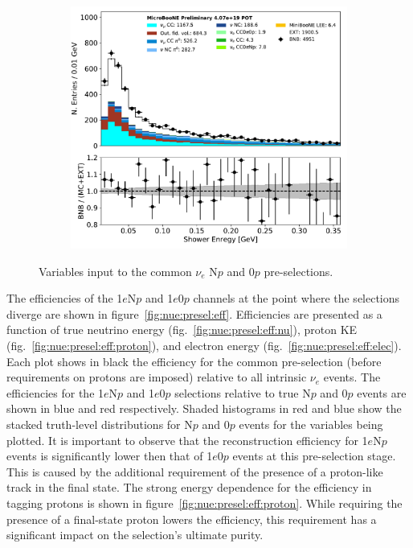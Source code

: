 \documentclass[a4paper]{article}
\begin{document}
\begin{figure}[H]
\begin{center}
\begin{subfigure}[b]{0.3\textwidth}
    \caption{\label{fig:nue:presel:ntrack} }
    \end{subfigure}
    \begin{subfigure}[b]{0.3\textwidth}
    \centering
    \includegraphics[width=1.00\textwidth]{nueselection/shr_energy_tot_cali_01132020_RUN1.pdf}
    \caption{\label{fig:nue:presel:shrenergy} }
    \end{subfigure}
\caption{\label{fig:nue:presel}Variables input to the common $\nu_e$ N$p$ and 0$p$ pre-selections.}
\end{center}
\end{figure}

\par The efficiencies of the 1$e$N$p$ and 1$e$0$p$ channels at the point where the selections diverge are shown in figure~\ref{fig:nue:presel:eff}. Efficiencies are presented as a function of true neutrino energy (fig.~\ref{fig:nue:presel:eff:nu}), proton KE (fig.~\ref{fig:nue:presel:eff:proton}), and electron energy (fig.~\ref{fig:nue:presel:eff:elec}). Each plot shows in black the efficiency for the common pre-selection (before requirements on protons are imposed) relative to all intrinsic $\nu_e$ events. The efficiencies for the  1$e$N$p$ and 1$e$0$p$ selections relative to true N$p$ and 0$p$ events are shown in blue and red respectively.
Shaded histograms in red and blue show the stacked truth-level distributions for N$p$ and 0$p$ events for the variables being plotted. It is important to observe that the reconstruction efficiency for 1$e$N$p$ events is significantly lower then that of 1$e$0$p$ events at this pre-selection stage. This is caused by the additional requirement of the presence of a proton-like track in the final state. The strong energy dependence for the efficiency in tagging protons is shown in figure~\ref{fig:nue:presel:eff:proton}. While requiring the presence of a final-state proton lowers the efficiency, this requirement has a significant impact on the selection's ultimate purity.
\end{document}
